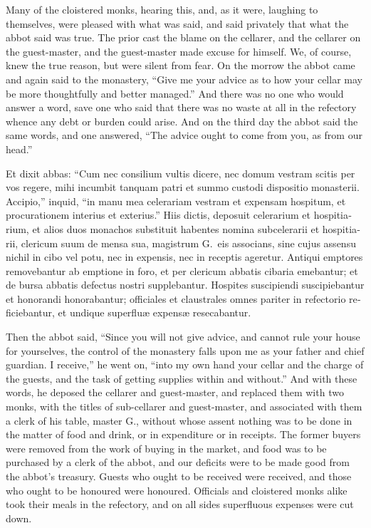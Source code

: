 \documentclass{book}
\begin{document}
\begin{paracol}{2}
\switchcolumn

Many of the cloistered monks, hearing this, and, as it were, laughing to themselves, were pleased with what was said, and said privately that what the abbot said was true. The prior cast the blame on the cellarer, and the cellarer on the guest-master, and the guest-master made excuse for himself. We, of course, knew the true reason, but were silent from fear. On the morrow the abbot came and again said to the monastery, ``Give me your advice as to how your cellar may be more thoughtfully and better managed.'' And there was no one who would answer a word, save one who said that there was no waste at all in the refectory whence any debt or burden could arise. And on the third day the abbot said the same words, and one answered, ``The advice ought to come from you, as from our head.''

\switchcolumn*

\begin{otherlanguage}{latin}
Et dixit abbas: ``Cum nec consilium vultis dicere, nec domum vestram scitis per vos regere, mihi incumbit tanquam patri et summo custodi dispositio monasterii. Accipio,'' inquid, ``in manu mea celerariam vestram et expensam hospitum, et procurationem interius et exterius.'' Hiis dictis, deposuit celerarium et hospitiarium, et alios duos monachos substituit habentes nomina subcelerarii et hospitiarii, clericum suum de mensa sua, magistrum G.\ eis associans, sine cujus assensu nichil in cibo vel potu, nec in expensis, nec in receptis ageretur. Antiqui emptores removebantur ab emptione in foro, et per clericum abbatis cibaria emebantur; et de bursa abbatis defectus nostri supplebantur. Hospites suscipiendi suscipiebantur et honorandi honorabantur; officiales et claustrales omnes pariter in refectorio reficiebantur, et undique superflu\ae{} expens\ae{} resecabantur.
\end{otherlanguage}

\switchcolumn

Then the abbot said, ``Since you will not give advice, and cannot rule your house for yourselves, the control of the monastery falls upon me as your father and chief guardian. I receive,'' he went on, ``into my own hand your cellar and the charge of the guests, and the task of getting supplies within and without.'' And with these words, he deposed the cellarer and guest-master, and replaced them with two monks, with the titles of sub-cellarer and guest-master, and associated with them a clerk of his table, master G., without whose assent nothing was to be done in the matter of food and drink, or in expenditure or in receipts. The former buyers were removed from the work of buying in the market, and food was to be purchased by a clerk of the abbot, and our deficits were to be made good from the abbot's treasury. Guests who ought to be received were received, and those who ought to be honoured were honoured. Officials and cloistered monks alike took their meals in the refectory, and on all sides superfluous expenses were cut down.


\end{paracol}
\end{document}
